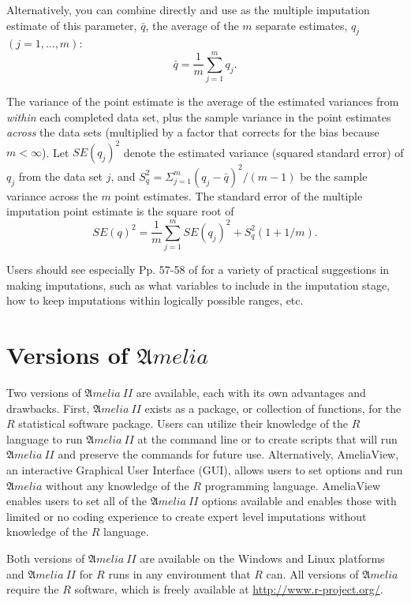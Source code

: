 \documentclass[12pt,titlepage]{article}
\newcommand{\Amelia}{\ensuremath{\mathfrak Amelia} }
\newcommand{\AmeliaII}{\ensuremath{\mathfrak Amelia~II} }
\begin{document}
Alternatively, you can combine directly and use as the multiple
imputation estimate of this parameter, $\bar{q}$, the average of the
$m$ separate estimates, $q_j$ $(j=1,...,m)$:
\begin{equation}
  \bar{q}=\frac{1}{m}\sum^{m}_{j=1}q_j.  
\end{equation}

The variance of the point estimate is the average of the estimated
variances from \emph{within} each completed data set, plus the sample
variance in the point estimates \emph{across} the data sets
(multiplied by a factor that corrects for the bias because
$m<\infty$).  Let $SE(q_j)^2$ denote the estimated variance (squared
standard error) of $q_j$ from the data set $j$, and
$S^{2}_{q}=\Sigma^{m}_{j=1}(q_j-\bar{q})^2/(m-1)$ be the sample
variance across the $m$ point estimates.  The standard error of the
multiple imputation point estimate is the square root of
\begin{equation}
SE(q)^2=\frac{1}{m}\sum^{m}_{j=1}SE(q_j)^2+S^2_q(1+1/m).
\end{equation}

Users should see especially Pp. 57-58 of \citet{KinHonJos01} for a
variety of practical suggestions in making imputations, such as what
variables to include in the imputation stage, how to keep imputations
within logically possible ranges, etc.

\section{Versions of ${\mathfrak Amelia}$}

\label{sec:versions}
Two versions of \AmeliaII are available, each with its own advantages
and drawbacks.  First, \AmeliaII exists as a package, or collection of
functions, for the $R$ statistical software package.  Users can utilize
their knowledge of the $R$ language to run \AmeliaII at the command line
or to create scripts that will run \AmeliaII and preserve the commands
for future use.  Alternatively, AmeliaView, an interactive Graphical
User Interface (GUI), allows users to set options and run \Amelia
without any knowledge of the $R$ programming language.  AmeliaView
enables users to set all of the \AmeliaII options available and enables
those with limited or no coding experience to create expert level
imputations without knowledge of the $R$ language.

Both versions of \AmeliaII are available on the Windows and Linux
platforms and \AmeliaII for $R$ runs in any environment that $R$ can.  All
versions of ${\mathfrak Amelia}$ require the $R$ software, which is
freely available at \url{http://www.r-project.org/}.
\end{document}
